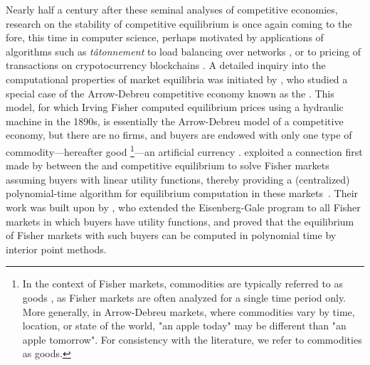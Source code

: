Nearly half a century after these seminal analyses of competitive economies, research on the stability of competitive equilibrium is once again coming to the fore, this time in computer science, perhaps motivated by applications of algorithms such as \emph{t\^atonnement\/} to load balancing over networks \cite{jain2013constrained}, or to pricing of transactions on crypotocurrency blockchains \cite{leonardos2021dynamical, liu2022empirical, reijsbergen2021transaction}.
A detailed inquiry into the computational properties of market equilibria was initiated by \citet{devanur2008market}, who studied a special case of the Arrow-Debreu competitive economy known as the  \cite{brainard2000compute}.
This model, for which Irving Fisher computed equilibrium prices using a hydraulic machine in the 1890s, is essentially the Arrow-Debreu model of a competitive economy, but there are no firms, and buyers are endowed with only one type of commodity---hereafter good%
\footnote{In the context of Fisher markets, commodities are typically referred to as goods \citep{fisher-tatonnement}, as Fisher markets are often analyzed for a single time period only.
More generally, in Arrow-Debreu markets, where commodities vary by time, location, or state of the world, "an apple today" may be different than "an apple tomorrow". For consistency with the literature, we refer to commodities as goods. }---an artificial currency 
\cite{brainard2000compute, AGT-book}.
\citet{devanur2002market} exploited a connection first made by \citet{eisenberg1961aggregation} between the  and competitive equilibrium to solve Fisher markets assuming buyers with linear utility functions, thereby providing a (centralized) polynomial-time algorithm for equilibrium computation in these markets~\cite{devanur2002market,devanur2008market}.
Their work was built upon by \citet{jain2005market}, who extended the Eisenberg-Gale program to all Fisher markets in which buyers have  utility functions, and proved that the equilibrium of Fisher markets with such buyers can be computed in polynomial time by interior point methods. 

